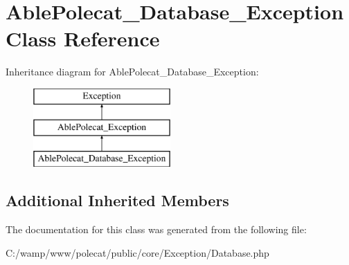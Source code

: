 \hypertarget{class_able_polecat___database___exception}{}\section{Able\+Polecat\+\_\+\+Database\+\_\+\+Exception Class Reference}
\label{class_able_polecat___database___exception}
Inheritance diagram for Able\+Polecat\+\_\+\+Database\+\_\+\+Exception\+:\begin{figure}[H]
\begin{center}
\leavevmode
\includegraphics[height=3.000000cm]{class_able_polecat___database___exception}
\end{center}
\end{figure}
\subsection*{Additional Inherited Members}


The documentation for this class was generated from the following file\+:\begin{DoxyCompactItemize}
\item 
C\+:/wamp/www/polecat/public/core/\+Exception/Database.\+php\end{DoxyCompactItemize}
